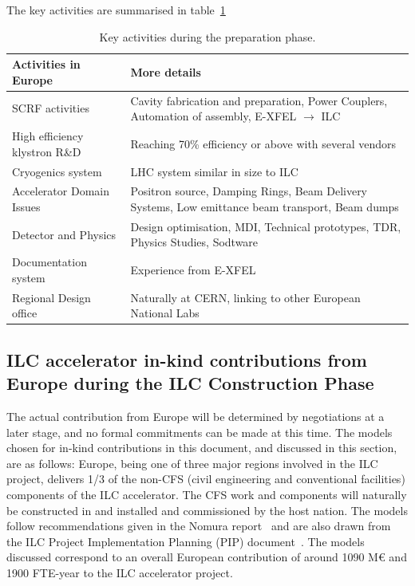 \documentclass[%
 reprint,
 floatfix,
 amsmath,amssymb,
 aps,
]{revtex4-1}
\begin{document}
The key activities are summarised in table~\ref{fig:prep-phase-summary} 




\begin{table}[htbp]

\begin{tabular}{p{3.5cm}p{4.75cm}}
 \bfseries {Activities in Europe} &\bfseries{More details}                                                         \\[4pt]\hline\noalign{\smallskip}
SCRF activities			&Cavity fabrication and preparation, Power Couplers, Automation of assembly, E-XFEL $\rightarrow$ ILC\\[4pt]
High efficiency klystron R\&D   &Reaching 70\% efficiency or above with several vendors   \\[4pt]
Cryogenics system               &LHC system similar in size to ILC\\[4pt]
Accelerator Domain Issues       &Positron source, Damping Rings, Beam Delivery Systems, Low emittance beam transport, Beam dumps\\[4pt]
Detector and Physics            &Design optimisation, MDI, Technical prototypes, TDR, Physics Studies, Sodtware\\[4pt]
Documentation system            &Experience from E-XFEL                                       \\[4pt]
Regional Design office          &Naturally at CERN, linking to other European National Labs \\[5pt] \hline
\end{tabular}

\caption{\label{fig:prep-phase-summary} Key activities during the preparation phase.}
\end{table}


\subsection{ILC accelerator in-kind contributions from Europe during the ILC Construction Phase ~\label{sec:acc:constrphase}}

The actual contribution from Europe will be determined by negotiations at a 
later stage, and no formal commitments can be made at this time. The models 
chosen for in-kind contributions in this document, and discussed in this 
section, are as follows: Europe, being one of three major regions involved in 
the ILC project, delivers 1/3 of the non-CFS (civil engineering and conventional facilities) 
components of the ILC accelerator. The CFS work 
and components will naturally be constructed in and installed and 
commissioned by the host nation. The models follow recommendations given in 
the Nomura report~\cite{Nomura-eng} and are also drawn from the ILC Project Implementation 
Planning (PIP) document~\cite{ILCPIP}. The models discussed correspond to an overall 
European contribution of around 1090 M\euro{} and 1900 FTE-year to the ILC accelerator project. 
\end{document}
